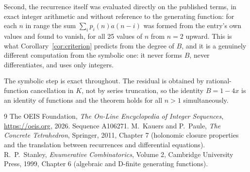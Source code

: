 \documentclass[11pt,a4paper]{article}
\theoremstyle{plain}
\theoremstyle{definition}
\begin{document}
Second, the recurrence itself was evaluated directly on the published terms, in exact
integer arithmetic and without reference to the generating function: for each $n$ in range
the sum $\sum_{i}p_{i}(n)a(n-i)$ was formed from the entry's own values and found to
vanish, for all 25 values of $n$ from $n=2$ upward. This is what
Corollary~\ref{cor:criterion} predicts from the degree of $B$, and it is a genuinely
different computation from the symbolic one: it never forms $B$, never differentiates, and
uses only integers.

The symbolic step is exact throughout. The residual is obtained by rational-function
cancellation in $K$, not by series truncation, so the identity $B=1 - 4 x$ is an
identity of functions and the theorem holds for all $n>1$ simultaneously.

\begin{thebibliography}{9}
 The OEIS Foundation, \emph{The On-Line Encyclopedia of Integer Sequences},
\url{https://oeis.org}, 2026. Sequence A106271.
 M.~Kauers and P.~Paule, \emph{The Concrete Tetrahedron}, Springer, 2011,
Chapter 7 (holonomic closure properties and the translation between recurrences and
differential equations).
 R.~P.~Stanley, \emph{Enumerative Combinatorics}, Volume 2, Cambridge
University Press, 1999, Chapter 6 (algebraic and D-finite generating functions).
\end{thebibliography}
\end{document}
